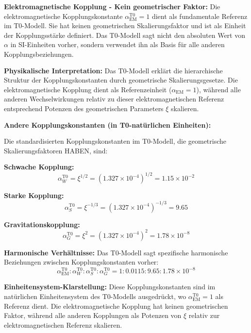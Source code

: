 \documentclass[12pt,a4paper]{article}
\newcommand{\xigeom}{\xi}
\begin{document}
	\textbf{Elektromagnetische Kopplung - Kein geometrischer Faktor:}
	Die elektromagnetische Kopplungskonstante $\alpha_{\text{EM}}^{\text{T0}} = 1$ dient als fundamentale Referenz im T0-Modell. Sie hat keinen geometrischen Skalierungsfaktor und ist als Einheit der Kopplungsstärke definiert. Das T0-Modell sagt nicht den absoluten Wert von $\alpha$ in SI-Einheiten vorher, sondern verwendet ihn als Basis für alle anderen Kopplungsbeziehungen.
	
	\textbf{Physikalische Interpretation:} Das T0-Modell erklärt die hierarchische Struktur der Kopplungskonstanten durch geometrische Skalierungsgesetze. Die elektromagnetische Kopplung dient als Referenzeinheit ($\alpha_{\text{EM}} = 1$), während alle anderen Wechselwirkungen relativ zu dieser elektromagnetischen Referenz entsprechend Potenzen des geometrischen Parameters $\xigeom$ skalieren.
	
	\textbf{Andere Kopplungskonstanten (in T0-natürlichen Einheiten):}
	
	Die standardisierten Kopplungskonstanten im T0-Modell, die geometrische Skalierungsfaktoren HABEN, sind:
	
	\textbf{Schwache Kopplung:}
	\begin{equation}
		\alpha_W^{\text{T0}} = \xigeom^{1/2} = (1.327 \times 10^{-4})^{1/2} = 1.15 \times 10^{-2}
	\end{equation}
	
	\textbf{Starke Kopplung:}
	\begin{equation}
		\alpha_S^{\text{T0}} = \xigeom^{-1/3} = (1.327 \times 10^{-4})^{-1/3} = 9.65
	\end{equation}
	
	\textbf{Gravitationskopplung:}
	\begin{equation}
		\alpha_G^{\text{T0}} = \xigeom^2 = (1.327 \times 10^{-4})^2 = 1.78 \times 10^{-8}
	\end{equation}
	
	\textbf{Harmonische Verhältnisse:}
	Das T0-Modell sagt spezifische harmonische Beziehungen zwischen Kopplungskonstanten vorher:
	\begin{equation}
		\alpha_{\text{EM}}^{\text{T0}} : \alpha_W^{\text{T0}} : \alpha_S^{\text{T0}} : \alpha_G^{\text{T0}} = 1 : 0.0115 : 9.65 : 1.78 \times 10^{-8}
	\end{equation}
	
	\textbf{Einheitensystem-Klarstellung:} 
	Diese Kopplungskonstanten sind im natürlichen Einheitensystem des T0-Modells ausgedrückt, wo $\alpha_{\text{EM}}^{\text{T0}} = 1$ als Referenz dient. Die elektromagnetische Kopplung hat keinen geometrischen Faktor, während alle anderen Kopplungen als Potenzen von $\xigeom$ relativ zur elektromagnetischen Referenz skalieren.
	
\end{document}

